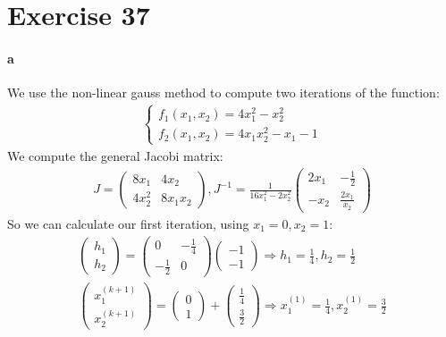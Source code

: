 \section{Exercise 37}
\paragraph{a}
We use the non-linear gauss method to compute two iterations of the function:
\begin{gather*}
\begin{cases}
f_1 (x_1,x_2) = 4x_1^2 - x_2^2 \\
f_2 (x_1,x_2) = 4x_1x_2^2 -x_1 -1
\end{cases}
\end{gather*}
We compute the general Jacobi matrix:
\begin{gather*}
J = \left( \begin{array}{cc}
8x_1 & 4x_2 \\
4x_2^2 & 8x_1x_2
\end{array} \right),
J^{-1} = \frac{1}{16x_1^2 - 2x_2^2}\left( \begin{array}{cc}
2x_1 & -\frac{1}{2}\\
-x_2 & \frac{2x_1}{x_2}
\end{array} \right)
\end{gather*}
So we can calculate our first iteration, using $x_1 = 0, x_2 = 1$:
\begin{gather*}
\left( \begin{array}{c}
h_1\\
h_2
\end{array} \right) = 
\left( \begin{array}{cc}
0 & -\frac{1}{4}\\
-\frac{1}{2} & 0
\end{array} \right)
\left( \begin{array}{c}
-1 \\ 
-1
\end{array} \right) \Rightarrow h_1 = \frac{1}{4}, h_2 = \frac{1}{2}\\
\left( \begin{array}{c}
x_1^{(k+1)}\\
x_2^{(k+1)}
\end{array} \right) = 
\left( \begin{array}{c}
0\\
1
\end{array} \right)+
\left( \begin{array}{c}
\frac{1}{4} \\
\frac{3}{2}
\end{array} \right) \Rightarrow x_1^{(1)} = \frac{1}{4}, x_2^{(1)} = \frac{3}{2}
\end{gather*}
